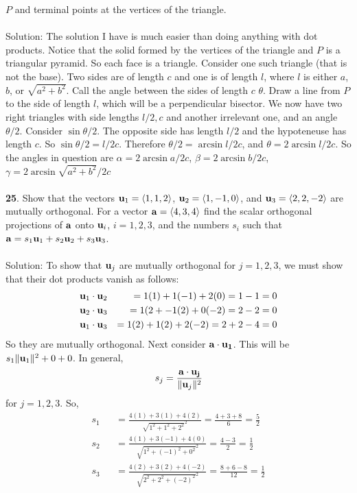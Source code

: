 \documentclass[12pt]{amsbook}
\newcommand{\la}{\langle}
\newcommand{\ra}{\rangle}
\begin{document}
$P$ and terminal points at the vertices of the triangle.\\
\\
{\sc Solution}:
The solution I have is much easier than doing anything with dot products. Notice that the solid formed by the vertices of the triangle and $P$ is a triangular pyramid. So each face is a triangle. Consider one such triangle (that is not the base). Two sides are of length $c$ and one is of length $l$, where $l$ is either $a$, $b$, or $\sqrt{a^2+b^2}$. Call the angle between the sides of length $c$ $\theta$. Draw a line from $P$ to the side of length $l$, which will be a perpendicular bisector. We now have two right triangles with side lengths $l/2, c$ and another irrelevant one, and an angle $\theta/2$. Consider $\sin\theta/2$. The opposite side has length $l/2$ and the hypoteneuse has length $c$. So $\sin\theta/2=l/2c$. Therefore $\theta/2=\arcsin l/2c$, and $\theta = 2\arcsin l/2c$. So the angles in question are $\alpha = 2\arcsin a/2c$, $\beta = 2\arcsin b/2c$, $\gamma = 2\arcsin \sqrt{a^2+b^2}/2c$
\\
\\
{\small\bf 25}. Show that the vectors
 ${\bf u}_1=\la 1,1,2\ra$, ${\bf u}_2=
\la 1,-1,0\ra$, and ${\bf u}_3=\la 2,2,-2\ra$ are mutually
orthogonal. For a vector ${\bf a}=\la4,3,4\ra$ find 
the scalar orthogonal projections of ${\bf a}$ onto 
${\bf u}_i$, $i=1,2,3$, and the numbers $s_i$ such that
${\bf a}=s_1{\bf u}_1+s_2{\bf u}_2+s_3{\bf u}_3$. \\
\\
{\sc Solution}: To show that ${\bf u}_j$ are mutually orthogonal for $j=1,2,3$, we must show that their dot products vanish as follows:
\begin{eqnarray*}
{\bf u}_1\cdot{\bf u}_2&&=1(1)+1(-1)+2(0)=1-1=0\\
{\bf u}_2\cdot{\bf u}_3&&=1(2+-1(2)+0(-2)=2-2=0\\
{\bf u}_1\cdot{\bf u}_3&&=1(2)+1(2)+2(-2)=2+2-4=0
\end{eqnarray*}
So they are mutually orthogonal. Next consider $\bf a\cdot{\bf u}_1$. This will be $s_1\|{\bf u}_1\|^2+0+0$. In general, $$s_j=\frac{\bf a\cdot{\bf u}_j}{\|{\bf u}_j\|^2}$$ for $j=1,2,3$. So,
\begin{eqnarray*}
s_1&&=\frac{4(1)+3(1)+4(2)}{\sqrt{1^2+1^2+2^2}^2}=\frac{4+3+8}{6}=\frac{5}{2}\\
s_2&&=\frac{4(1)+3(-1)+4(0)}{\sqrt{1^2+(-1)^2+0^2}^2}=\frac{4-3}{2}=\frac{1}{2}\\
s_3&&=\frac{4(2)+3(2)+4(-2)}{\sqrt{2^2+2^2+(-2)^2}^2}=\frac{8+6-8}{12}=\frac{1}{2}\\
\end{eqnarray*}
\end{document}
